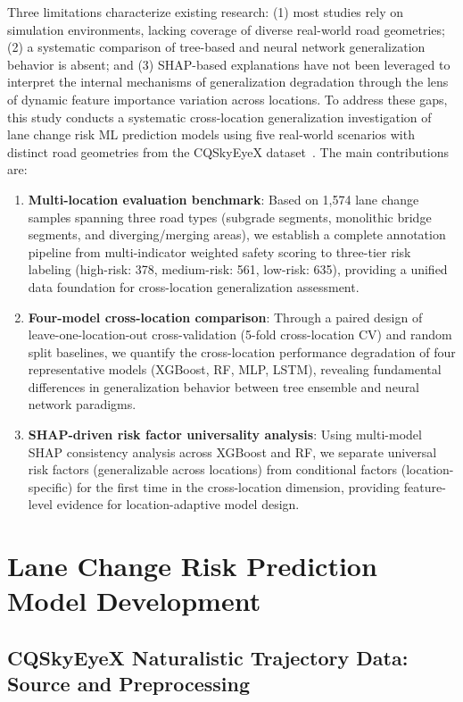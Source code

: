 \documentclass[preprint,review,12pt,a4paper]{elsarticle}
\begin{document}
Three limitations characterize existing research: (1) most studies rely on simulation environments, lacking coverage of diverse real-world road geometries; (2) a systematic comparison of tree-based and neural network generalization behavior is absent; and (3) SHAP-based explanations have not been leveraged to interpret the internal mechanisms of generalization degradation through the lens of dynamic feature importance variation across locations. To address these gaps, this study conducts a systematic cross-location generalization investigation of lane change risk ML prediction models using five real-world scenarios with distinct road geometries from the CQSkyEyeX dataset~\cite{C17}. The main contributions are:

\begin{enumerate}
  \item \textbf{Multi-location evaluation benchmark}: Based on 1,574 lane change samples spanning three road types (subgrade segments, monolithic bridge segments, and diverging/merging areas), we establish a complete annotation pipeline from multi-indicator weighted safety scoring to three-tier risk labeling (high-risk: 378, medium-risk: 561, low-risk: 635), providing a unified data foundation for cross-location generalization assessment.
  \item \textbf{Four-model cross-location comparison}: Through a paired design of leave-one-location-out cross-validation (5-fold cross-location CV) and random split baselines, we quantify the cross-location performance degradation of four representative models (XGBoost, RF, MLP, LSTM), revealing fundamental differences in generalization behavior between tree ensemble and neural network paradigms.
  \item \textbf{SHAP-driven risk factor universality analysis}: Using multi-model SHAP consistency analysis across XGBoost and RF, we separate universal risk factors (generalizable across locations) from conditional factors (location-specific) for the first time in the cross-location dimension, providing feature-level evidence for location-adaptive model design.
\end{enumerate}

\section{Lane Change Risk Prediction Model Development}

\subsection{CQSkyEyeX Naturalistic Trajectory Data: Source and Preprocessing}
\end{document}
